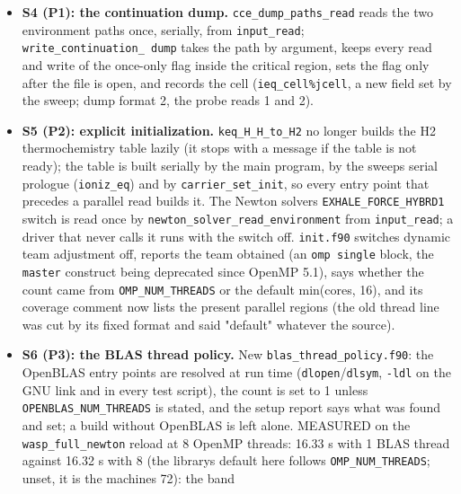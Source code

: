 \documentclass[english,a4paper]{my_memo}
\begin{document}
\begin{itemize}
  physical targets and non-monotone radii refused; ghosts extrapolated;
  metadata rewritten): 17/0. The Model A fixture\textquotesingle s \texttt{IC/} regenerated with
  it (physical rows identical to the earlier mapping, ghosts within 1e-4;
  the 3-pass run reproduces the day-before pass lines).
\item
  \textbf{S4 (P1): the continuation dump.} \texttt{cce\_dump\_paths\_read} reads the two
  environment paths once, serially, from \texttt{input\_read}; \texttt{write\_continuation\_\ dump} takes the path by argument, keeps every read and write of the
  once-only flag inside the critical region, sets the flag only after the
  file is open, and records the cell (\texttt{ieq\_cell\%jcell}, a new field set by
  the sweep; dump format 2, the probe reads 1 and 2).
\item
  \textbf{S5 (P2): explicit initialization.} \texttt{keq\_H\_H\_to\_H2} no longer builds
  the H2 thermochemistry table lazily (it stops with a message if the table
  is not ready); the table is built serially by the main program, by the
  sweep\textquotesingle s serial prologue (\texttt{ioniz\_eq}) and by \texttt{carrier\_set\_init}, so every
  entry point that precedes a parallel read builds it. The Newton solver\textquotesingle s
  \texttt{EXHALE\_FORCE\_HYBRD1} switch is read once by
  \texttt{newton\_solver\_read\_environment} from \texttt{input\_read}; a driver that never
  calls it runs with the switch off. \texttt{init.f90} switches dynamic team
  adjustment off, reports the team obtained (an \texttt{omp\ single} block, the
  \texttt{master} construct being deprecated since OpenMP 5.1), says whether the
  count came from \texttt{OMP\_NUM\_THREADS} or the default min(cores, 16), and its
  coverage comment now lists the present parallel regions (the old thread
  line was cut by its fixed format and said "default" whatever the
  source).
\item
  \textbf{S6 (P3): the BLAS thread policy.} New \texttt{blas\_thread\_policy.f90}: the
  OpenBLAS entry points are resolved at run time (\texttt{dlopen}/\texttt{dlsym}, \texttt{-ldl}
  on the GNU link and in every test script), the count is set to 1 unless
  \texttt{OPENBLAS\_NUM\_THREADS} is stated, and the setup report says what was
  found and set; a build without OpenBLAS is left alone. MEASURED on the
  \texttt{wasp\_full\_newton} reload at 8 OpenMP threads: 16.33 s with 1 BLAS
  thread against 16.32 s with 8 (the library\textquotesingle s default here follows
  \texttt{OMP\_NUM\_THREADS}; unset, it is the machine\textquotesingle s 72): the band

\end{itemize}
\end{document}
